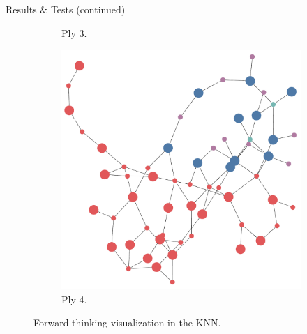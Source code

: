 \documentclass[final]{beamer} %
\begin{document}
\begin{frame}
\begin{columns}
\begin{column}{.35\textwidth}
{\begin{block}{Results \& Tests (continued)}
\begin{figure}[!htb]
\begin{subfigure}[!htb]{0.24\columnwidth}
							\caption{Ply 3.}
						\end{subfigure}
						\begin{subfigure}[!htb]{0.24\columnwidth}
							\centering
							\includegraphics[width=\columnwidth]{figures/knn_forward_think_4.pdf}
							\caption{Ply 4.}
						\end{subfigure}
						\caption{Forward thinking visualization in the KNN.}
					\end{figure}
					

\end{block}}
\end{column}
\end{columns}
\end{frame}
\end{document}
